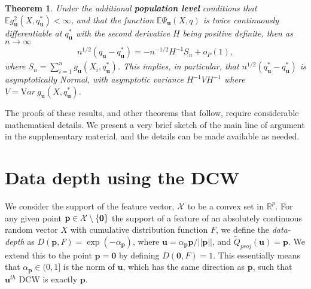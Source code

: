 \documentclass[twoside]{article}
\newtheorem{Theorem}{Theorem}[section]
\begin{document}
\begin{Theorem} \label{thm:AsyNorm}
Under the additional {\bf population level} conditions that  
$\mathbb{E} g_{\mathbf{u}}^{2} (X, q_{\mathbf{u}}^{*}) < \infty$,  and that
the function
$\mathbb{E} \Psi_{\mathbf{u}} (X, q) $ is twice continuously differentiable 
at $q_{\mathbf{u}}^{*}$ with the second
derivative $H$ being positive definite, then as $n \rightarrow \infty$
\begin{eqnarray*}
n^{1/2} ( q_{\mathbf{u}} - q_{\mathbf{u}}^{*}) 
= - n^{-1/2} H^{-1} S_{n} + o_{P} (1),
\end{eqnarray*}
where $S_{n} = \sum_{i=1}^{n} g_{\mathbf{u}} (X_{i}, q_{\mathbf{u}}^{*})$.  
This implies, in particular, that
$n^{1/2} ( q_{\mathbf{u}}^{*} - q_{\mathbf{u}}^{*})$ is asymptotically Normal, with asymptotic variance
$H^{-1} V H^{-1}$ where $V = {\mathrm Var }\  g_{\mathbf{u}} (X, q_{\mathbf{u}}^{*})$.
\end{Theorem}

The proofs of these results, and other theorems that follow, require considerable 
mathematical details. We present a very brief sketch of the main line of argument 
in the supplementary material, and the details can be made available as needed.
 
 
 \section{Data depth using the DCW}
\label{sec:DataDepth}

We consider the support of the feature vector, ${\cal{X}}$ to be a convex set in $\mathbb{R}^{p}$. 
For any given point $\mathbf{p} \in {\cal{X}} \setminus \{ \mathbf{0} \}$ 
the support of a feature of an absolutely continuous
random vector $X$ with cumulative distribution function $F$, 
we define  the {\it data-depth} as $D (\mathbf{p}, F) = \exp ( - \alpha_{\mathbf{p}})$, 
where $\mathbf{u} = \alpha_{\mathbf{p}} \mathbf{p} / || \mathbf{p} ||$, and 
 $\tilde Q_{proj} (\mathbf{u}) = \mathbf{p}$. We extend this to the point 
 $\mathbf{p} = \mathbf{0}$ by defining $D (\mathbf{0}, F)  = 1$. 
  This essentially means that 
 $\alpha_{\mathbf{p}} \in (0, 1]$ is the norm of $\mathbf{u}$, which has the same direction as $\mathbf{p}$, such that $\mathbf{u}^{th}$ DCW is exactly $\mathbf{p}$. 
 
\end{document}
